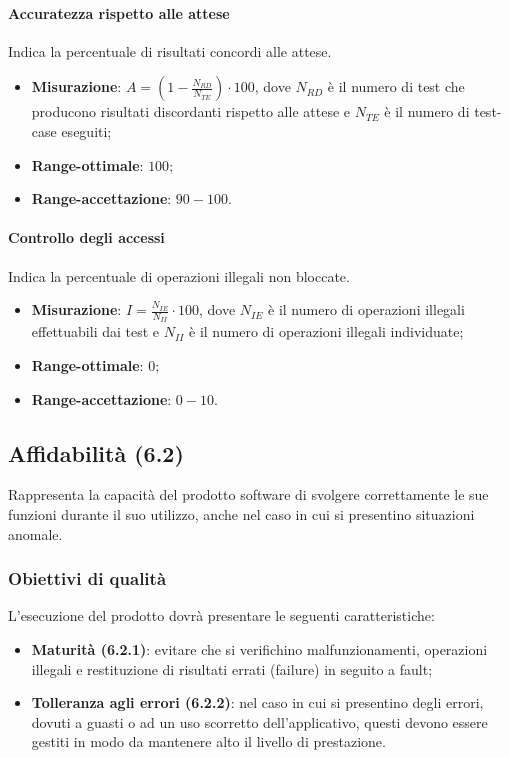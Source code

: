 \paragraph{Accuratezza rispetto alle attese}
Indica la percentuale di risultati concordi alle attese.
\begin{itemize}
\item \textbf{Misurazione}: $A=(1-\frac{N_{RD}}{N_{TE}}) \cdot 100$, dove $N_{RD}$ è il numero di test che producono risultati discordanti rispetto alle attese e $N_{TE}$ è il numero di test-case eseguiti;
\item \textbf{Range-ottimale}: $100$;
\item \textbf{Range-accettazione}: $90 - 100$.
\end{itemize}
\paragraph{Controllo degli accessi}
Indica la percentuale di operazioni illegali non bloccate.
\begin{itemize}
\item \textbf{Misurazione}: $I=\frac{N_{IE}}{N_{II}} \cdot 100$, dove $N_{IE}$ è il numero di operazioni illegali effettuabili dai test e $N_{II}$ è il numero di operazioni illegali individuate;
\item \textbf{Range-ottimale}: $0$;
\item \textbf{Range-accettazione}: $0 - 10$.
\end{itemize}


\subsection{Affidabilità (6.2)}
Rappresenta la capacità del prodotto software di svolgere correttamente le sue funzioni durante il suo utilizzo, anche nel caso in cui si presentino situazioni anomale.
\subsubsection{Obiettivi di qualità}
L'esecuzione del prodotto dovrà presentare le seguenti caratteristiche:
\begin{itemize}
\item \textbf{Maturità (6.2.1)}: evitare che si verifichino malfunzionamenti, operazioni illegali e restituzione di risultati errati (failure) in seguito a fault;
\item \textbf{Tolleranza agli errori (6.2.2)}: nel caso in cui si presentino degli errori, dovuti a guasti o ad un uso scorretto dell'applicativo, questi devono essere gestiti in modo da mantenere alto il livello di prestazione.
\end{itemize}
